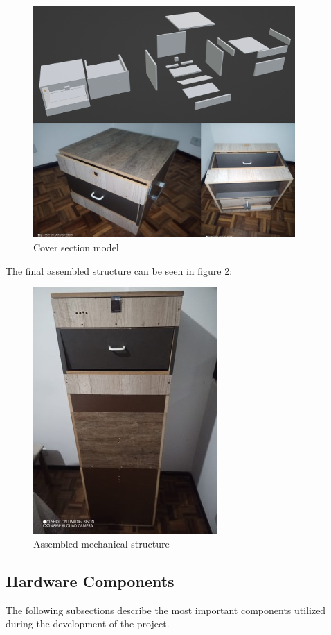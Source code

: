 \documentclass[a4paper,11pt]{article}
\begin{document}
\begin{figure}[H]
  \centering
  \includegraphics[width=10cm]{Figures/Cover Part.png}
  \caption{\small{Cover section model}}
  \label{fig:coverModel1}
\end{figure}

The final assembled structure can be seen in figure \ref{fig:fullBody}:

\begin{figure}[H]
  \centering
  \includegraphics[scale=0.7]{Figures/Full Structure.jpg}
  \caption{\small{Assembled mechanical structure}}
  \label{fig:fullBody}
\end{figure}

\subsection{Hardware Components}
\label{subsec:Hardware}
The following subsections describe the most important components utilized during the development of the project.
\end{document}
